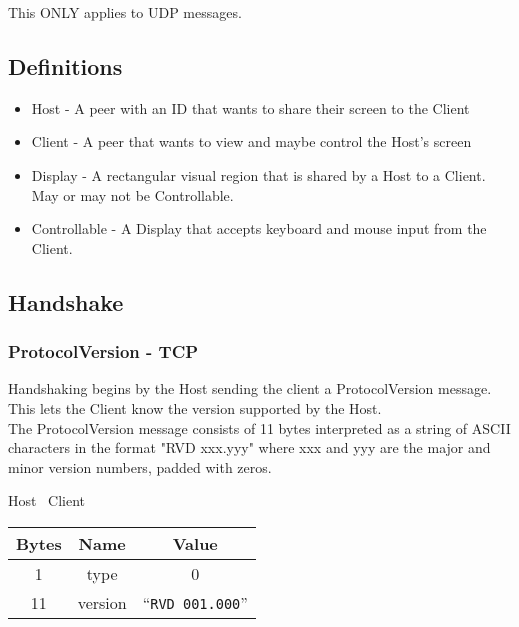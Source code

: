 This ONLY applies to UDP messages.

\subsection{Definitions}

\begin{itemize}
    \item Host - A peer with an ID that wants to share their screen to the Client
    \item Client - A peer that wants to view and maybe control the Host's screen
    \item Display - A rectangular visual region that is shared by a Host to a Client. May or may not be
    Controllable.
    \item Controllable - A Display that accepts keyboard and mouse input from the Client.
\end{itemize}

\subsection{Handshake}

\subsubsection{ProtocolVersion - TCP}
Handshaking begins by the Host sending the client a ProtocolVersion message. This lets the Client know the
version supported by the Host.\\

The ProtocolVersion message consists of 11 bytes interpreted as a string of ASCII characters in the format
"RVD xxx.yyy" where xxx and yyy are the major and minor version numbers, padded with zeros.

\begin{center}
    Host \textrightarrow\ Client\\
    \begin{tabular}{|c|c|c|}
        \hline
        \textbf{Bytes} & \textbf{Name} & \textbf{Value}           \\
        \hline
        1              & type                 & 0                  \\
        \hline
        11             & version       & ``\texttt{RVD 001.000}'' \\
        \hline
    \end{tabular}
\end{center}

